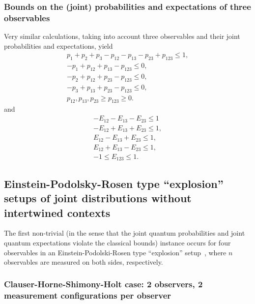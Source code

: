 \documentclass[%
  twocolumn,
 showpacs,
 showkeys,
 preprintnumbers,
 amsmath,amssymb,
 aps,
  pra,
  longbibliography,
 floatfix,
 ]{revtex4-1}
\begin{document}
\subsubsection{Bounds on the (joint) probabilities and expectations of three observables}

Very similar calculations, taking into account three observables and their joint probabilities and expectations,
yield
\begin{equation}
\begin{split}
  p_1 +p_2 +p_3  -p_{12}  -p_{13}  -p_{23} +p_{123}  \le   1 ,\\
  -p_1   +p_{12} +p_{13}     -p_{123}  \le     0             ,\\
      -p_2    +p_{12}    +p_{23}  -p_{123}    \le    0       ,\\
         -p_3    +p_{13} +p_{23}  -p_{123}    \le    0        ,\\
    p_{12},p_{13},p_{23} \ge p_{123} \ge 0
.
\end{split}
\label{2017-b-1-3-p-i}
\end{equation}
and
\begin{equation}
\begin{split}
- E_{12}- E_{13}- E_{23}  \le  1
\\
- E_{12}+ E_{13}+ E_{23}  \le  1,
\\
 E_{12}- E_{13}+ E_{23}  \le  1,
\\
 E_{12}+ E_{13}- E_{23}  \le  1,
\\
-1\le E_{123}  \le 1
.
\end{split}
\label{2017-b-1-3-e-i}
\end{equation}



\subsection{Einstein-Podolsky-Rosen type ``explosion'' setups of joint distributions without intertwined contexts}

The first non-trivial (in the sense that the joint quantum probabilities and joint quantum expectations violate the classical bounds) instance
occurs for four observables in an Einstein-Podolski-Rosen type ``explosion'' setup~\cite{epr},
where $n$ observables are measured on both sides, respectively.



\subsubsection{Clauser-Horne-Shimony-Holt case: 2 observers, 2 measurement configurations per observer}
\label{2017-b-chshc1}
\end{document}
